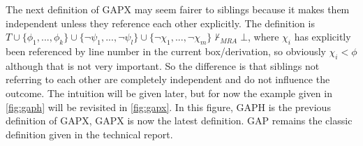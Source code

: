 \documentclass[11pt,twoside,a4paper]{report}
\begin{document}
The next definition of GAPX may seem fairer to siblings because it makes them independent unless they reference each other explicitly. The definition is $T\cup\{\phi_1, ..., \phi_k\}\cup\{\neg\psi_1, ..., \neg\psi_l\}\cup\{\neg\chi_1, ..., \neg\chi_m\}\nvdash_{MRA}\bot$, where $\chi_i$ has explicitly been referenced by line number in the current box/derivation, so obviously $\chi_i < \phi$ although that is not very important. So the difference is that siblings not referring to each other are completely independent and do not influence the outcome. The intuition will be given later, but for now the example given in \autoref{fig:gaph} will be revisited in \autoref{fig:gapx}. In this figure, GAPH is the previous definition of GAPX, GAPX is now the latest definition. GAP remains the classic definition given in the technical report.
\end{document}
